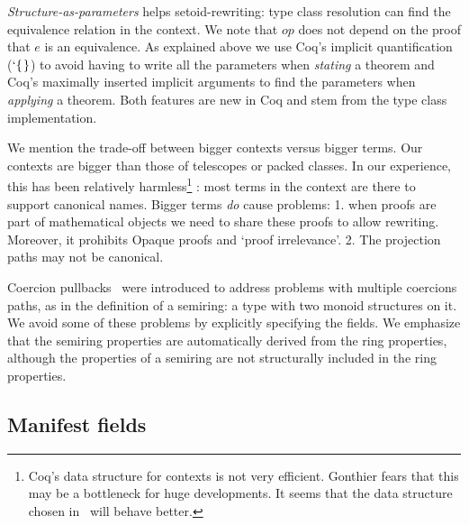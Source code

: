 \documentclass[a4paper,10pt, runningheads]{llncs}
\newcommand{\Varid}[1]{\mathit{#1}}
\begin{document}
\emph{Structure-as-parameters} helps setoid-rewriting: type class resolution
can find the equivalence relation in the context.
We note that \ensuremath{\Varid{op}} does not depend on the proof that \ensuremath{\Varid{e}} is an equivalence. As explained above we
use Coq's implicit quantification (\ensuremath{\hspace*{0mm}`\hspace*{0mm}\{\mskip1.5mu\}}) to avoid having to write all the parameters when
\emph{stating} a theorem and Coq's maximally inserted implicit arguments to find the parameters when
\emph{applying} a theorem. Both features are new in Coq and stem from the type class implementation.

We mention the trade-off between bigger contexts versus bigger terms. Our contexts are bigger than
those of telescopes or packed classes. In our experience, this has been relatively
harmless\footnote{Coq's data structure for contexts is not very efficient. Gonthier fears that this
may be a bottleneck for huge developments. It seems that the data structure chosen
in~\cite{asperti2009compact} will behave better.}%
: most terms in the context are there to support canonical names. Bigger terms
\emph{do} cause problems: 1. when proofs are part of mathematical objects we need to share these
proofs to allow rewriting. Moreover, it prohibits Opaque proofs and `proof irrelevance'. 2. The
projection paths may not be canonical.

Coercion pullbacks~\cite{Hints} were introduced to address problems with multiple coercions paths,
as in the definition of a semiring: a type with two monoid structures on it. We avoid some
of these problems by explicitly specifying the fields. We emphasize that the semiring properties are automatically derived from the ring
properties, although the properties of a semiring are not structurally included in the ring
properties.

\subsection{Manifest fields}\label{manifest}
\end{document}
